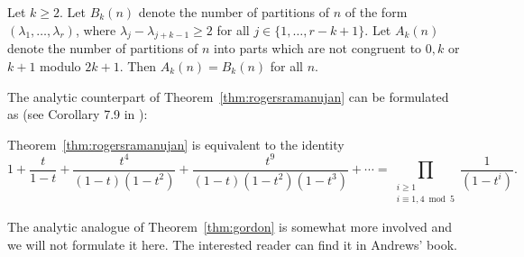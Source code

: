 \begin{Thm}\label{thm:gordon}
Let $k\geq 2$. Let $B_k(n)$ denote the number of partitions of $n$ of the form $(\lambda_1,\ldots,\lambda_r)$, where $\lambda_j - \lambda_{j+k-1}\geq 2$ for all $j \in \{ 1, \ldots, r-k+1\}$. Let $A_k(n)$ denote the number of partitions of $n$ into parts which are not congruent to $0, k$ or $k+1$ modulo $2k+1$. Then $A_k(n) = B_k(n)$ for all $n$.
\end{Thm}

The analytic counterpart of Theorem~\ref{thm:rogersramanujan} can be formulated as (see Corollary 7.9 in \cite{andrews_partitions}):

\begin{Cor}\label{cor:rogersramanujan_analytic}
Theorem~\ref{thm:rogersramanujan} is equivalent to the identity
$$1 + \frac{t}{1-t} + \frac{t^4}{(1-t)(1-t^2)} +
\frac{t^9}{(1-t)(1-t^2)(1-t^3)} + \cdots = \prod_{\substack{i\geq 1\\i\equiv 1,4\bmod 5}}\frac{1}{(1-t^i)}.$$
\end{Cor}

The analytic analogue of Theorem~\ref{thm:gordon} is somewhat more involved and we will not formulate it here. The interested reader can find it in Andrews' book.